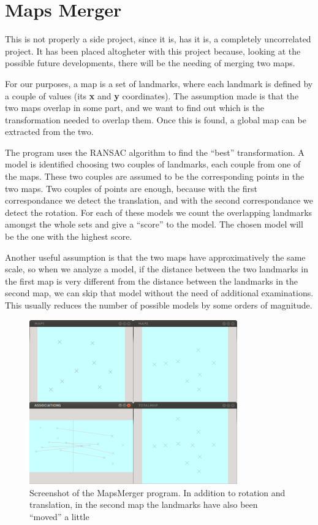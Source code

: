 \section{Maps Merger}
This is not properly a side project, since it is, has it is, a completely uncorrelated project.
It has been placed altogheter with this project because, looking at the possible future developments, there will be the needing of merging two maps.

For our purposes, a map is a set of landmarks, where each landmark is defined by a couple of values (its \textbf{x} and \textbf{y} coordinates).
The assumption made is that the two maps overlap in some part, and we want to find out which is the transformation needed to overlap them. Once this is found, a global map can be extracted from the two.

The program uses the RANSAC algorithm to find the ``best'' transformation.
A model is identified choosing two couples of landmarks, each couple from one of the maps. These two couples are assumed to be the corresponding points in the two maps.
Two couples of points are enough, because with the first correspondance we detect the translation, and with the second correspondance we detect the rotation.
For each of these models we count the overlapping landmarks amongst the whole sets and give a ``score'' to the model. The chosen model will be the one with the highest score.

Another useful assumption is that the two maps have approximatively the same scale, so when we analyze a model, if the distance between the two landmarks in the first map is very different from the distance between the landmarks in the second map, we can skip that model without the need of additional examinations. This usually reduces the number of possible models by some orders of magnitude.

\begin{figure}[htbp]
  \centering
    \includegraphics[width=0.8\textwidth]{images/mapsmerger.png}
  \caption{Screenshot of the MapsMerger program. In addition to rotation and translation, in the second map the landmarks have also been ``moved'' a little}
  \label{fig:mapsmerger}
\end{figure}
